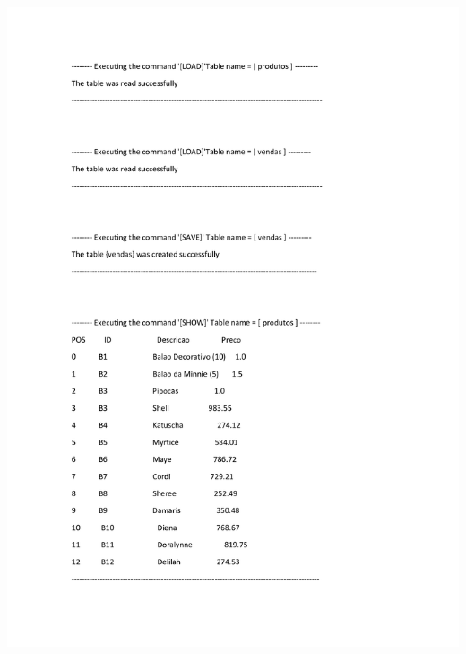 \documentclass{article}
\begin{document}
\noindent
\includegraphics[width=1.3\textwidth]{3}
\end{document}
